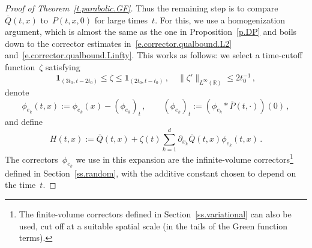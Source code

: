 \documentclass[11pt,twoside]{article} %
\numberwithin{equation}{section}
\theoremstyle{definition}
\newcommand*{\R}{\ensuremath{\mathbb{R}}}
\newcommand{\indc}{\boldsymbol{1}}
\begin{document}
\begin{proof}[{Proof of Theorem~\ref{t.parabolic.GF}}]
\smallskip

Thus the remaining step is to compare~$\overline{Q}(t,x)$ to~$P(t,x,0)$ for large times~$t$. For this, we use a homogenization argument, which is almost the same as the one in Proposition~\ref{p.DP} and boils down to the corrector estimates in~\eqref{e.corrector.qualbound.L2} and~\eqref{e.corrector.qualbound.Linfty}. 
This works as follows: we select a time-cutoff function~$\zeta$ satisfying 
\begin{equation}
\label{e.zetacutends}
\indc_{ (3t_0, t-2t_0)} 
\leq 
\zeta 
\leq
\indc_{ (2t_0, t-t_0)}\,, 
\quad 
\| \zeta' \|_{L^\infty(\R)} \leq 2t_0^{-1}\,,
\end{equation}
denote 
\begin{equation*} 
\phi_{e_k}(t,x) :=  \phi_{e_k}(x) - (\phi_{e_k})_t \,, \qquad  (\phi_{e_k})_t  := (\phi_{e_k} \ast \overline{P}(t,\cdot))(0)  \,,
\end{equation*}
and define 
\begin{equation*}
H(t,x):= 
\overline{Q}(t,x) 
+
\zeta(t) \sum_{k=1}^d
\partial_{x_k} \overline{Q}(t,x) 
\phi_{e_k} (t,x) 
\,.
\end{equation*}
The correctors~$\phi_{e_k}$ we use in this expansion are the infinite-volume correctors\footnote{The finite-volume correctors defined in Section~\ref{ss.variational} can also be used, cut off at a suitable spatial scale (in the tails of the Green function terms).} defined in Section~\ref{ss.random}, with the additive constant chosen to depend on the time~$t$. 

\smallskip


\end{proof}
\end{document}
